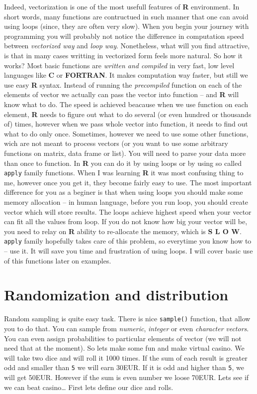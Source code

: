 \documentclass[]{book}
\theoremstyle{definition}
\theoremstyle{definition}
\theoremstyle{definition}
\theoremstyle{remark}
\begin{document}
Indeed, vectorization is one of the most usefull features of \textbf{R}
environment. In short words, many functions are contructued in such
manner that one can avoid using loops (since, they are often very slow).
When you begin your journey with programming you will probably not
notice the difference in computation speed between \emph{vectorized way}
and \emph{loop way}. Nonetheless, what will you find attractive, is that
in many cases writting in vectorized form feels more natural. So how it
works? Most basic functions are \emph{written and compiled} in very
fast, low level languages like \textbf{C} or \textbf{FORTRAN}. It makes
computation way faster, but still we use easy \textbf{R} syntax. Instead
of running the \emph{precompiled} function on each of the elements of
vector we actually can pass the vector into function -- and \textbf{R}
will know what to do. The speed is achieved beacause when we use
function on each element, \textbf{R} needs to figure out what to do
several (or even hundred or thousands of) times, however when we pass
whole vector into function, it needs to find out what to do only once.
Sometimes, however we need to use some other functions, wich are not
meant to process vectors (or you want to use some arbitrary functions on
matrix, data frame or list). You will need to parse your data more than
once to function. In \textbf{R} you can do it by using loops or by using
so called \texttt{apply} family functions. When I was learning
\textbf{R} it was most confusing thing to me, however once you get it,
they become fairly easy to use. The most important difference for you as
a beginer is that when using loops you should make some memory
allocation -- in human language, before you run loop, you should create
vector which will store results. The loops achieve highest speed when
your vector can fit all the values from loop. If you do not know how big
your vector will be, you need to relay on \textbf{R} ability to
re-allocate the memory, which is \textbf{S L O W}. \texttt{apply} family
hopefully takes care of this problem, so everytime you know how to --
use it. It will save you time and frustration of using loops. I will
cover basic use of this functions later on examples.

\section{Randomization and
distribution}\label{randomization-and-distribution}

Random sampling is quite easy task. There is nice \texttt{sample()}
function, that allow you to do that. You can sample from \emph{numeric},
\emph{integer} or even \emph{character} \emph{vectors}. You can even
assign probabilities to particular elements of vector (we will not need
that at the moment). So lets make some fun and make virtual casino. We
will take two dice and will roll it 1000 times. If the sum of each
result is greater odd and smaller than \texttt{5} we will earn 30EUR. If
it is odd and higher than \texttt{5}, we will get 50EUR. However if the
sum is even number we loose 70EUR. Lets see if we can beat
casino\ldots{} First lets define our dice and rolls.
\end{document}
